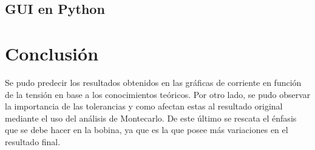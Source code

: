 \documentclass[a4paper]{article}
\begin{document}
\subsection*{GUI en Python}

\section*{Conclusión}

Se pudo predecir los resultados obtenidos en las gráficas de corriente en función de la tensión en base a los conocimientos teóricos. Por otro lado, se pudo observar la importancia de las tolerancias y como afectan estas al resultado original mediante el uso del análisis de Montecarlo. De este último se rescata el énfasis que se debe hacer en la bobina, ya que es la que posee más variaciones en el resultado final. 
\end{document}
